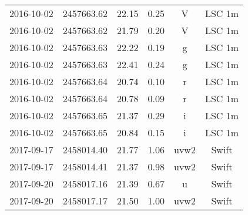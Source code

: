 \begin{table}
\begin{tabular}{cccccc}
2016-10-02 & 2457663.62 & 22.15 & 0.25 & V & LSC 1m \\
2016-10-02 & 2457663.62 & 21.79 & 0.20 & V & LSC 1m \\
2016-10-02 & 2457663.63 & 22.22 & 0.19 & g & LSC 1m \\
2016-10-02 & 2457663.63 & 22.41 & 0.24 & g & LSC 1m \\
2016-10-02 & 2457663.64 & 20.74 & 0.10 & r & LSC 1m \\
2016-10-02 & 2457663.64 & 20.78 & 0.09 & r & LSC 1m \\
2016-10-02 & 2457663.65 & 21.37 & 0.29 & i & LSC 1m \\
2016-10-02 & 2457663.65 & 20.84 & 0.15 & i & LSC 1m \\
2017-09-17 & 2458014.40 & 21.77 & 1.06 & uvw2 & Swift \\
2017-09-17 & 2458014.41 & 21.37 & 0.98 & uvw2 & Swift \\
2017-09-20 & 2458017.16 & 21.39 & 0.67 & u & Swift \\
2017-09-20 & 2458017.17 & 21.50 & 1.00 & uvw2 & Swift \\
\end{tabular}
\end{table}
